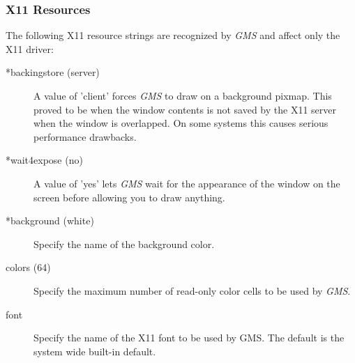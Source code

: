 \newpage



\subsubsection{X11 Resources\label{XRes}}The following X11 resource strings 
are recognized by {\em GMS\/} and affect only the X11 driver:
\begin{description}
\item[*backingstore (server)]\mbox{}


A value of 'client' forces {\em GMS\/} to draw on a 
background pixmap. This proved to be  when the 
window contents is not saved by the X11 server when
the window is overlapped. On some systems this causes
serious performance drawbacks.
\item[*wait4expose (no)]\mbox{}

 A value of 'yes' lets {\em GMS\/} wait 
for the appearance of the window on the screen before
allowing you to draw anything.
             
\item[*background (white)]\mbox{}

 Specify the name of the background color.

\item[colors (64)]\mbox{}

 Specify the maximum number of read-only color cells
to be used by {\em GMS\/}.
\item[font]\mbox{}

 Specify the name of the X11 font to be used by GMS.
The default is the system wide built-in default.
\end{description}





\newpage



